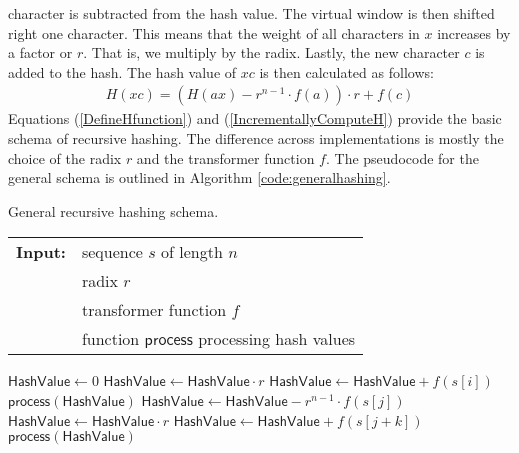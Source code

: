\documentclass[11pt,a4paper]{scrartcl}
\newcommand{\HashValue}[0]{\mathsf{HashValue}}
\begin{document}
character is subtracted from the hash value. The virtual window is then
shifted right one character. This means that the weight of all characters
in \(x\) increases by a factor or \(r\). That is, we multiply by the radix.
Lastly, the new character \(c\) is added to the hash.
The hash value of \(xc\) is then calculated as follows:
\begin{align}
H(xc) = (H(ax)-r^{n-1}\cdot f(a))\cdot r+f(c)\label{IncrementallyComputeH}
\end{align}
Equations (\ref{DefineHfunction}) and (\ref{IncrementallyComputeH})
provide the basic schema of recursive hashing. The
difference across implementations is mostly the choice of the radix $r$ and
the transformer function $f$. The pseudocode for the general schema is
outlined in Algorithm \ref{code:generalhashing}.
\begin{algorithm}[t]
\caption{General recursive hashing schema.}
\label{code:generalhashing}
\begin{tabular}{@{}l@{~}l}
\textbf{Input:}&sequence $s$ of length $n$\\
               &radix \(r\)\\
               &transformer function \(f\)\\
               &function \(\mathsf{process}\) processing hash values
\end{tabular}
\begin{algorithmic}
\State \(\HashValue \gets 0\)
\State \(\HashValue \gets \HashValue \cdot r\)
\State \(\HashValue \gets \HashValue + f(s[i])\)
\EndFor
\State \(\mathsf{process}(\HashValue)\)
\State \(\HashValue \gets \HashValue - r^{n-1}\cdot f(s[j])\)
\State \(\HashValue \gets \HashValue \cdot r\)
\State \(\HashValue \gets \HashValue + f(s[j+k])\)
\State \(\mathsf{process}(\HashValue)\)
\EndFor
\end{algorithmic}
\end{algorithm}
\end{document}
